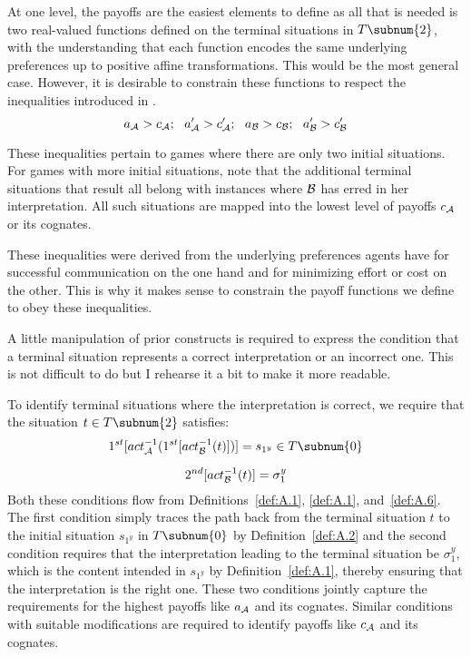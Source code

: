 At one level, the payoffs are the easiest elements to define as all that is needed is two real-valued functions defined on the terminal situations in $T\subnum{2}$, with the understanding that each function encodes the same underlying preferences up to positive affine transformations. This would be the most general case. However, it is desirable to constrain these functions to respect the inequalities introduced in .
\[ a_{\cal A} > c_{\cal A};\ \ a'_{\cal A} > c'_{\cal A};\ \ a_{\cal B} > c_{\cal B};\ \ a'_{\cal B} > c'_{\cal B} \] 

%
%
\noindent These inequalities pertain to games where there are only two initial situations. For games with more initial situations, note that the additional terminal situations that result all belong with instances where $\cal B$ has erred in her interpretation. All such situations are mapped into the lowest level of payoffs $c_{\cal A}$ or its cognates.

These inequalities were derived from the underlying preferences agents have for successful communication on the one hand and for minimizing effort or cost on the other. This is why it makes sense to constrain the payoff functions we define to obey these inequalities.

A little manipulation of prior constructs is required to express the condition that a terminal situation represents a correct interpretation or an incorrect one. This is not difficult to do but I rehearse it a bit to make it more readable.

To identify terminal situations where the interpretation is correct, we require that the situation $t \in T\subnum{2}$ satisfies:
\[ 1^{st}[act_{\cal A}^{-1}(1^{st}[act_{\cal B}^{-1}(t)])] = s_{1^y} \in T\subnum{0} \]


\[ 2^{nd}[act_{\cal B}^{-1}(t)] = \sigma_1^y \]
\noindent\largerpage Both these conditions flow from Definitions~\ref{def:A.1}, \ref{def:A.1}, and~\ref{def:A.6}. The first condition simply traces the path back from the terminal situation $t$ to the initial situation $s_{1^y}$ in $T\subnum{0}$ by Definition~\ref{def:A.2} and the second condition requires that the interpretation leading to the terminal situation be $\sigma_1^y$, which is the content intended in $s_{1^y}$ by Definition~\ref{def:A.1}, thereby ensuring that the interpretation is the right one. These two conditions jointly capture the requirements for the highest payoffs like  $a_{\cal A}$ and its cognates. Similar conditions with suitable modifications are required to identify payoffs like $c_{\cal A}$ and its cognates.

